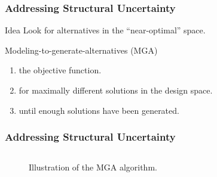 


\begin{frame}
    \frametitle{Addressing Structural Uncertainty}

        \begin{block}{Idea}
            Look for alternatives in the ``near-optimal'' space.            
        \end{block}

        \begin{block}{Modeling-to-generate-alternatives (MGA)}
            \begin{enumerate}
                \item {} the objective function.
                \item {} for maximally different solutions in the design space.
                \item {} until enough solutions have been generated.
            \end{enumerate}        
        \end{block}
        
        

\end{frame}

\begin{frame}
    \frametitle{Addressing Structural Uncertainty}

    \begin{columns}
        \column[t]{10cm}
        \begin{figure}
            \centering
            \resizebox{0.75\columnwidth}{!}{}
            \caption{Illustration of the MGA algorithm.}
            \label{fig:standard-mga}
        \end{figure}
    \end{columns}

\end{frame}

